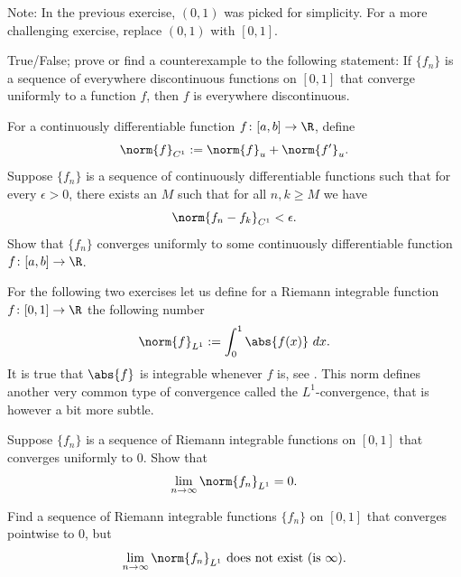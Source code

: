 \documentclass[12pt]{book}
\begin{document}
\begin{exnote}
Note: In the previous exercise, $(0,1)$ was picked for simplicity.
For a
more challenging exercise, replace $(0,1)$ with $[0,1]$.
\end{exnote}

\begin{exercise}
True/False; prove or find a counterexample to the following statement:
If $\{ f_n \}$ is a sequence of everywhere discontinuous functions on $[0,1]$
that converge uniformly to a function $f$, then $f$ is everywhere
discontinuous.
\end{exercise}

\begin{exercise} \label{c1uniflim:exercise}
For a continuously differentiable function $f \colon [a,b] \to \R$, define
\begin{equation*}
\norm{f}_{C^1} := \norm{f}_u + \norm{f'}_u .
\end{equation*}
Suppose $\{ f_n \}$ is a sequence of continuously differentiable
functions such that for every $\epsilon >0$, there exists an $M$
such that for all $n,k \geq M$ we have
\begin{equation*}
\norm{f_n-f_k}_{C^1} < \epsilon .
\end{equation*}
Show that $\{ f_n \}$ converges uniformly to some continuously differentiable
function $f \colon [a,b] \to \R$.
\end{exercise}

\begin{exnote}
For the following two exercises let us define for a Riemann integrable
function $f \colon [0,1] \to
\R$ the following number
\begin{equation*}
\norm{f}_{L^1} := 
\int_0^1 \abs{f(x)}~dx .
\end{equation*}
It is true that $\abs{f}$ is integrable whenever $f$ is, see
.
This norm defines another very common type of
convergence called the $L^1$-convergence, that is however a bit more
subtle.
\end{exnote}

\begin{exercise}
Suppose $\{ f_n \}$ is a sequence of Riemann integrable functions on $[0,1]$
that converges uniformly
to $0$.
Show that
\begin{equation*}
\lim_{n\to\infty} \norm{f_n}_{L^1} = 0 .
\end{equation*}
\end{exercise}

\begin{exercise}
Find a sequence of Riemann integrable functions 
$\{ f_n \}$ on $[0,1]$ that converges pointwise to $0$, but
\begin{equation*}
\lim_{n\to\infty} \norm{f_n}_{L^1} \text{ does not exist (is $\infty$).}
\end{equation*}
\end{exercise}
\end{document}

